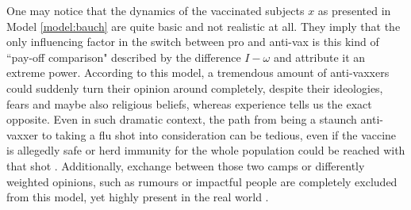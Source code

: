 \documentclass[12pt,a4paper,twoside]{article}
\begin{document}
One may notice that the dynamics of the vaccinated subjects $x$ as presented in Model \ref{model:bauch} are quite basic and not realistic at all. They imply that the only influencing factor in the switch between pro and anti-vax is this kind of ``pay-off comparison" described by the difference $I - \omega$ and attribute it an extreme power. According to this model, a tremendous amount of anti-vaxxers could suddenly turn their opinion around completely, despite their ideologies, fears and maybe also religious beliefs, whereas experience tells us the exact opposite. Even in such dramatic context, the path from being a staunch anti-vaxxer to taking a flu shot into consideration can be tedious, even if the vaccine is allegedly safe or herd immunity for the whole population could be reached with that shot \cite{Meyer2004, Bednarz2020, Health2019}. Additionally, exchange between those two camps or differently weighted opinions, such as rumours or impactful people are completely excluded from this model, yet highly present in the real world \cite{Pincock2004}.
\end{document}
